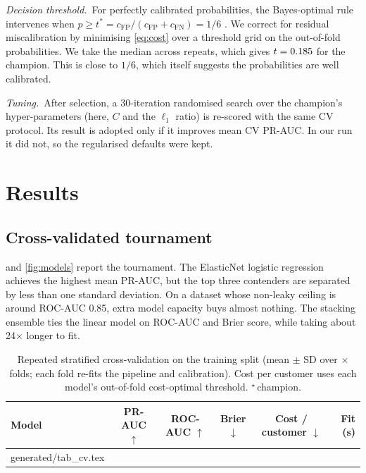 \documentclass[conference]{IEEEtran}
\makeatletter
\newcommand{\genrows}[1]{\@@input generated/#1.tex }
\newcommand{\para}[1]{\par\textit{#1.}\ }%
\makeatother
\begin{document}
\para{Decision threshold}For perfectly calibrated probabilities, the Bayes-optimal rule
intervenes when $p\geq t^\ast=c_{\mathrm{FP}}/(c_{\mathrm{FP}}+c_{\mathrm{FN}})=1/6$
\cite{elkan2001foundations}. We correct for residual miscalibration by minimising \cref{eq:cost}
over a threshold grid on the out-of-fold probabilities. We take the median across repeats,
which gives $t=0.185$ for the champion. This is close to $1/6$, which itself suggests the
probabilities are well calibrated.

\para{Tuning}After selection, a 30-iteration randomised search over the champion's
hyper-parameters (here, $C$ and the $\ell_1$ ratio) is re-scored with the same CV protocol. Its
result is adopted only if it improves mean CV PR-AUC. In our run it did not, so the regularised
defaults were kept.

\section{Results}
\label{sec:results}

\subsection{Cross-validated tournament}
 and \cref{fig:models} report the tournament. The ElasticNet logistic regression
achieves the highest mean PR-AUC, but the top three contenders are separated by less than one
standard deviation. On a dataset whose non-leaky ceiling is around ROC-AUC 0.85, extra model
capacity buys almost nothing. The stacking ensemble ties the linear model on ROC-AUC and Brier
score, while taking about 24$\times$ longer to fit.

\begin{table}[t]
\centering
\caption{Repeated stratified cross-validation on the training split (mean $\pm$ SD over
\CVRepeats{}$\times$\CVFolds{} folds; each fold re-fits the pipeline and calibration). Cost per customer
uses each model's out-of-fold cost-optimal threshold. $^\star$\,champion.}
\label{tab:cv}
\small
\begin{tabular}{@{}l c c c c r@{}}
\toprule
\textbf{Model} & \textbf{PR-AUC} $\uparrow$ & \textbf{ROC-AUC} $\uparrow$ & \textbf{Brier} $\downarrow$ & \textbf{Cost / customer} $\downarrow$ & \textbf{Fit (s)}\\
\midrule
\genrows{tab_cv}
\bottomrule
\end{tabular}
\end{table}
\end{document}
